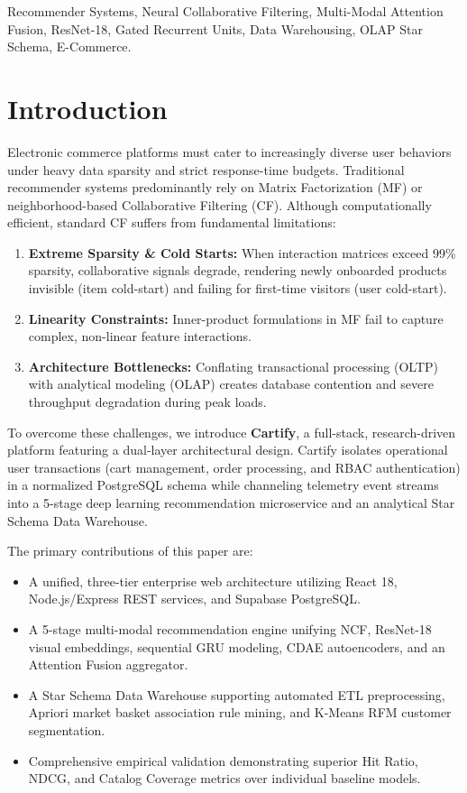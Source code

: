 \documentclass[conference]{IEEEtran}
\begin{document}
\begin{IEEEkeywords}
Recommender Systems, Neural Collaborative Filtering, Multi-Modal Attention Fusion, ResNet-18, Gated Recurrent Units, Data Warehousing, OLAP Star Schema, E-Commerce.
\end{IEEEkeywords}

\section{Introduction}
Electronic commerce platforms must cater to increasingly diverse user behaviors under heavy data sparsity and strict response-time budgets. Traditional recommender systems predominantly rely on Matrix Factorization (MF) or neighborhood-based Collaborative Filtering (CF). Although computationally efficient, standard CF suffers from fundamental limitations:
\begin{enumerate}
    \item \textbf{Extreme Sparsity \& Cold Starts:} When interaction matrices exceed 99\% sparsity, collaborative signals degrade, rendering newly onboarded products invisible (item cold-start) and failing for first-time visitors (user cold-start).
    \item \textbf{Linearity Constraints:} Inner-product formulations in MF fail to capture complex, non-linear feature interactions.
    \item \textbf{Architecture Bottlenecks:} Conflating transactional processing (OLTP) with analytical modeling (OLAP) creates database contention and severe throughput degradation during peak loads.
\end{enumerate}

To overcome these challenges, we introduce \textbf{Cartify}, a full-stack, research-driven platform featuring a dual-layer architectural design. Cartify isolates operational user transactions (cart management, order processing, and RBAC authentication) in a normalized PostgreSQL schema while channeling telemetry event streams into a 5-stage deep learning recommendation microservice and an analytical Star Schema Data Warehouse.

The primary contributions of this paper are:
\begin{itemize}
    \item A unified, three-tier enterprise web architecture utilizing React 18, Node.js/Express REST services, and Supabase PostgreSQL.
    \item A 5-stage multi-modal recommendation engine unifying NCF, ResNet-18 visual embeddings, sequential GRU modeling, CDAE autoencoders, and an Attention Fusion aggregator.
    \item A Star Schema Data Warehouse supporting automated ETL preprocessing, Apriori market basket association rule mining, and K-Means RFM customer segmentation.
    \item Comprehensive empirical validation demonstrating superior Hit Ratio, NDCG, and Catalog Coverage metrics over individual baseline models.
\end{itemize}
\end{document}
